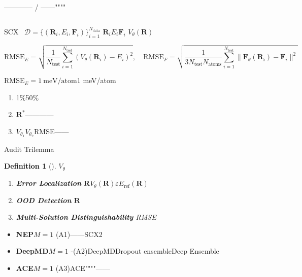 \documentclass[12pt,a4paper]{article}
\newtheorem{definition}[theorem]{Definition}
\theoremstyle{remark}
\newcommand{\D}{\mathcal{D}}
\begin{document}
——\textbf{}——
/
\textbf{}——""""

\subsection{}

SCX~\cite{scx_ml_audit,scx_hamiltonian}\textbf{}
$\D = \{(\mathbf{R}_i, E_i, \mathbf{F}_i)\}_{i=1}^{N_{\text{data}}}$
$\mathbf{R}_i$$E_i$$\mathbf{F}_i$
$V_\theta(\mathbf{R})$

\begin{equation}\label{eq:rmse_def}
    \text{RMSE}_E = \sqrt{\frac{1}{N_{\text{test}}}\sum_{i=1}^{N_{\text{test}}}(V_\theta(\mathbf{R}_i) - E_i)^2},
    \quad
    \text{RMSE}_F = \sqrt{\frac{1}{3N_{\text{test}}N_{\text{atoms}}}\sum_{i=1}^{N_{\text{test}}}\|\mathbf{F}_\theta(\mathbf{R}_i) - \mathbf{F}_i\|^2}
\end{equation}

$\text{RMSE}_E = 1\ \text{meV/atom}$\textit{}1 meV/atom
\textit{}
\begin{enumerate}[label=(\arabic*),itemsep=3pt]
    \item 1\%50\%
    \item $\mathbf{R}^*$————
    \item $V_{\theta_1}$$V_{\theta_2}$RMSE——
\end{enumerate}

\textbf{}Audit Trilemma


\begin{definition}[]
$V_\theta$\textbf{}
\begin{enumerate}[label=\textbf{(A\arabic*)},leftmargin=*,itemsep=4pt]
    \item \textbf{Error Localization} $\mathbf{R}$$V_\theta(\mathbf{R})$$\varepsilon$$E_{\text{ref}}(\mathbf{R})$
    \item \textbf{OOD Detection} $\mathbf{R}$
    \item \textbf{Multi-Solution Distinguishability} RMSE
\end{enumerate}
\end{definition}


\begin{itemize}[itemsep=3pt]
    \item \textbf{NEP$M=1$} (A1)——SCX2~\cite{scx_ml_audit}
    \item \textbf{DeepMD$M=1$} -(A2)DeepMDDropout ensembleDeep Ensemble\textit{}
    \item \textbf{ACE$M=1$} \textit{}(A3)ACE""""——
\end{itemize}
\end{document}
